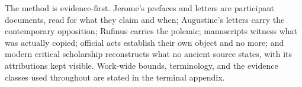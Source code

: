 The method is evidence-first. Jerome's prefaces and letters are participant
documents, read for what they claim and when; Augustine's letters carry the
contemporary opposition; Rufinus carries the polemic; manuscripts witness
what was actually copied; official acts establish their own object and no
more; and modern critical scholarship reconstructs what no ancient source
states, with its attributions kept visible. Work-wide bounds, terminology,
and the evidence classes used throughout are stated in the terminal
appendix.
